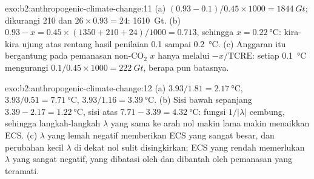 \begin{solution}{exo:b2:anthropogenic-climate-change:11}
(a) $(0.93 - 0.1)/0.45 \times 1000 = \qty{1844}{Gt}$; dikurangi 210 dan $26 \times 0.93 = 24$:
\qty{1610}{Gt}. (b) $0.93 - x = 0.45 \times (1350 + 210 + 24)/1000 = 0.713$, sehingga $x =
\qty{0.22}{\celsius}$: kira-kira ujung atas rentang hasil penilaian 0.1 sampai \qty{0.2}{\celsius}. (c) Anggaran
itu bergantung pada pemanasan non-CO$_2$ $x$ hanya melalui $-x/\text{TCRE}$: setiap
\qty{0.1}{\celsius} mengurangi $0.1/0.45 \times 1000 = \qty{222}{Gt}$, berapa pun batasnya.
\end{solution}

\begin{solution}{exo:b2:anthropogenic-climate-change:12}
(a) $3.93/1.81 = \qty{2.17}{\celsius}$, $3.93/0.51 = \qty{7.71}{\celsius}$, $3.93/1.16 =
\qty{3.39}{\celsius}$. (b) Sisi bawah sepanjang $3.39 - 2.17 = \qty{1.22}{\celsius}$, sisi atas
$7.71 - 3.39 = \qty{4.32}{\celsius}$: fungsi $1/|\lambda|$ cembung, sehingga langkah-langkah $\lambda$ yang sama
ke arah nol makin lama makin menaikkan ECS. (c) $\lambda$ yang lemah negatif memberikan ECS yang sangat
besar, dan perubahan kecil $\lambda$ di dekat nol sulit disingkirkan; ECS yang rendah memerlukan $\lambda$ yang sangat
negatif, yang dibatasi oleh  dan dibantah oleh pemanasan yang teramati.
\end{solution}

